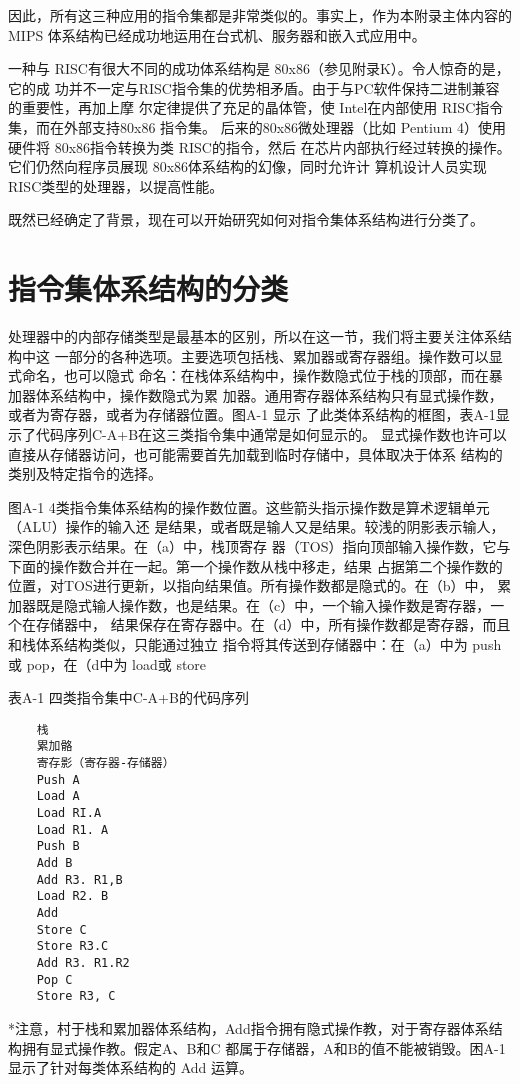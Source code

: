 因此，所有这三种应用的指令集都是非常类似的。事实上，作为本附录主体内容的 MIPS
体系结构已经成功地运用在台式机、服务器和嵌入式应用中。

一种与 RISC有很大不同的成功体系结构是 80x86（参见附录K）。令人惊奇的是，它的成
功并不一定与RISC指令集的优势相矛盾。由于与PC软件保持二进制兼容的重要性，再加上摩
尔定律提供了充足的晶体管，使 Intel在内部使用 RISC指令集，而在外部支持80x86 指令集。
后来的80x86微处理器（比如 Pentium 4）使用硬件将 80x86指令转换为类 RISC的指令，然后
在芯片内部执行经过转换的操作。它们仍然向程序员展现 80x86体系结构的幻像，同时允许计
算机设计人员实现RISC类型的处理器，以提高性能。

既然已经确定了背景，现在可以开始研究如何对指令集体系结构进行分类了。

\section{指令集体系结构的分类}
处理器中的内部存储类型是最基本的区别，所以在这一节，我们将主要关注体系结构中这
一部分的各种选项。主要选项包括栈、累加器或寄存器组。操作数可以显式命名，也可以隐式
命名：在栈体系结构中，操作数隐式位于栈的顶部，而在暴加器体系结构中，操作数隐式为累
加器。通用寄存器体系结构只有显式操作数，或者为寄存器，或者为存储器位置。图A-1 显示
了此类体系结构的框图，表A-1显示了代码序列C-A+B在这三类指令集中通常是如何显示的。
显式操作数也许可以直接从存储器访问，也可能需要首先加载到临时存储中，具体取决于体系
结构的类别及特定指令的选择。

图A-1 4类指令集体系结构的操作数位置。这些箭头指示操作数是算术逻辑单元（ALU）操作的输入还
是结果，或者既是输人又是结果。较浅的阴影表示输人，深色阴影表示结果。在（a）中，栈顶寄存
器（TOS）指向顶部输入操作数，它与下面的操作数合并在一起。第一个操作数从栈中移走，结果
占据第二个操作数的位置，对TOS进行更新，以指向结果值。所有操作数都是隐式的。在（b）中，
累加器既是隐式输人操作数，也是结果。在（c）中，一个输入操作数是寄存器，一个在存储器中，
结果保存在寄存器中。在（d）中，所有操作数都是寄存器，而且和栈体系结构类似，只能通过独立
指令将其传送到存储器中：在（a）中为 push 或 pop，在（d中为 load或 store

表A-1 四类指令集中C-A+B的代码序列
\begin{verbatim}
    栈
    累加骼
    寄存影（寄存器-存储器）
    Push A
    Load A
    Load RI.A
    Load R1. A
    Push B
    Add B
    Add R3. R1,B
    Load R2. B
    Add
    Store C
    Store R3.C
    Add R3. R1.R2
    Pop C
    Store R3, C
\end{verbatim}
*注意，村于栈和累加器体系结构，Add指令拥有隐式操作教，对于寄存器体系结构拥有显式操作教。假定A、B和C
都属于存储器，A和B的值不能被销毁。困A-1显示了针对每类体系结构的 Add 运算。

